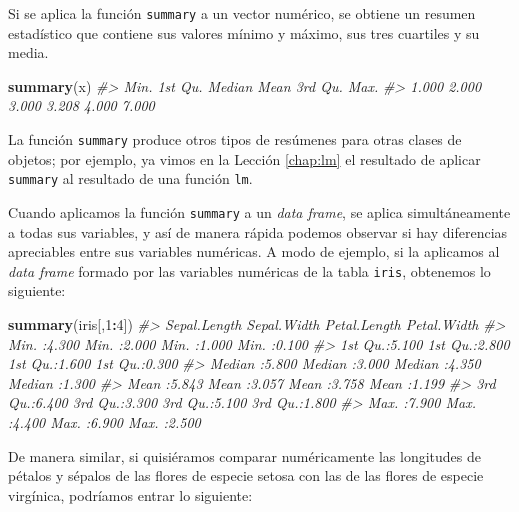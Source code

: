 \documentclass[
]{book}
\newenvironment{Shaded}{\begin{snugshade}}{\end{snugshade}}
\newcommand{\CommentTok}[1]{\textcolor[rgb]{0.56,0.35,0.01}{\textit{#1}}}
\newcommand{\DecValTok}[1]{\textcolor[rgb]{0.00,0.00,0.81}{#1}}
\newcommand{\KeywordTok}[1]{\textcolor[rgb]{0.13,0.29,0.53}{\textbf{#1}}}
\newcommand{\NormalTok}[1]{#1}
\newcommand{\OperatorTok}[1]{\textcolor[rgb]{0.81,0.36,0.00}{\textbf{#1}}}
\theoremstyle{definition}
\theoremstyle{definition}
\theoremstyle{definition}
\theoremstyle{remark}
\begin{document}
Si se aplica la función \texttt{summary} a un vector numérico, se obtiene un resumen estadístico que contiene sus valores mínimo y máximo, sus tres cuartiles y su media.

\begin{Shaded}
\begin{Highlighting}[]
\KeywordTok{summary}\NormalTok{(x)}
\CommentTok{\#\textgreater{}    Min. 1st Qu.  Median    Mean 3rd Qu.    Max. }
\CommentTok{\#\textgreater{}   1.000   2.000   3.000   3.208   4.000   7.000}
\end{Highlighting}
\end{Shaded}

La función \texttt{summary} produce otros tipos de resúmenes para otras clases de objetos; por ejemplo, ya vimos en la Lección \ref{chap:lm} el resultado de aplicar \texttt{summary} al resultado de una función \texttt{lm}.

Cuando aplicamos la función \texttt{summary} a un \emph{data frame}, se aplica simultáneamente a todas sus variables, y así de manera rápida podemos observar si hay diferencias apreciables entre sus variables numéricas. A modo de ejemplo, si la aplicamos al \emph{data frame} formado por las variables numéricas de la tabla \texttt{iris}, obtenemos lo siguiente:

\begin{Shaded}
\begin{Highlighting}[]
\KeywordTok{summary}\NormalTok{(iris[,}\DecValTok{1}\OperatorTok{:}\DecValTok{4}\NormalTok{])}
\CommentTok{\#\textgreater{}   Sepal.Length    Sepal.Width     Petal.Length    Petal.Width   }
\CommentTok{\#\textgreater{}  Min.   :4.300   Min.   :2.000   Min.   :1.000   Min.   :0.100  }
\CommentTok{\#\textgreater{}  1st Qu.:5.100   1st Qu.:2.800   1st Qu.:1.600   1st Qu.:0.300  }
\CommentTok{\#\textgreater{}  Median :5.800   Median :3.000   Median :4.350   Median :1.300  }
\CommentTok{\#\textgreater{}  Mean   :5.843   Mean   :3.057   Mean   :3.758   Mean   :1.199  }
\CommentTok{\#\textgreater{}  3rd Qu.:6.400   3rd Qu.:3.300   3rd Qu.:5.100   3rd Qu.:1.800  }
\CommentTok{\#\textgreater{}  Max.   :7.900   Max.   :4.400   Max.   :6.900   Max.   :2.500}
\end{Highlighting}
\end{Shaded}

De manera similar, si quisiéramos comparar numéricamente las longitudes de pétalos y sépalos de las flores de especie setosa con las de las flores de especie virgínica, podríamos entrar lo siguiente:
\end{document}
